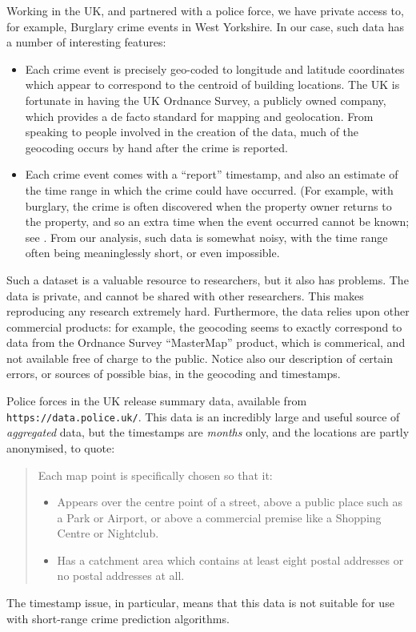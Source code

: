 \documentclass[twoside,a4paper,twocolumn,10pt]{article}
\theoremstyle{plain}
\theoremstyle{definition}
\begin{document}
Working in the UK, and partnered with a police force, we have private access to,
for example, Burglary crime events in West Yorkshire.  In our case, such data has a
number of interesting features:
\begin{itemize}
\item Each crime event is precisely geo-coded to longitude and latitude coordinates
  which appear to correspond to the centroid of building locations.  The UK is fortunate
  in having the UK Ordnance Survey, a publicly owned company, which provides a de facto
  standard for mapping and geolocation.  From speaking to people involved in the creation
  of the data, much of the geocoding occurs by hand after the crime is reported.
\item Each crime event comes with a ``report'' timestamp, and also an estimate of the
  time range in which the crime could have occurred.  (For example, with burglary, the
  crime is often discovered when the property owner returns to the property, and so an
  extra time when the event occurred cannot be known; see \cite{ratcliffe}.
  From our analysis, such data is somewhat noisy, with the time range often being meaninglessly
  short, or even impossible.
\end{itemize}
Such a dataset is a valuable resource to researchers, but it also has problems.  The data
is private, and cannot be shared with other researchers.  This makes reproducing any
research extremely hard.  Furthermore, the data relies upon other
commercial products: for example, the geocoding seems to exactly correspond to data
from the Ordnance Survey ``MasterMap'' product, which is commerical, and not available
free of charge to the public.  Notice also our description of certain errors, or sources of
possible bias, in the geocoding and timestamps.

Police forces in the UK release summary data, available from \texttt{https://data.police.uk/}.
This data is an incredibly large and useful source of \emph{aggregated} data, but the timestamps
are \emph{months} only, and the locations are partly anonymised, to quote:
\begin{quote}
Each map point is specifically chosen so that it:
\begin{itemize}
\item Appears over the centre point of a street, above a public place such as a Park or Airport, or
  above a commercial premise like a Shopping Centre or Nightclub.
\item Has a catchment area which contains at least eight postal addresses or no postal addresses at all.
\end{itemize}
\end{quote}
The timestamp issue, in particular, means that this data is not suitable for use with
short-range crime prediction algorithms.
\end{document}
